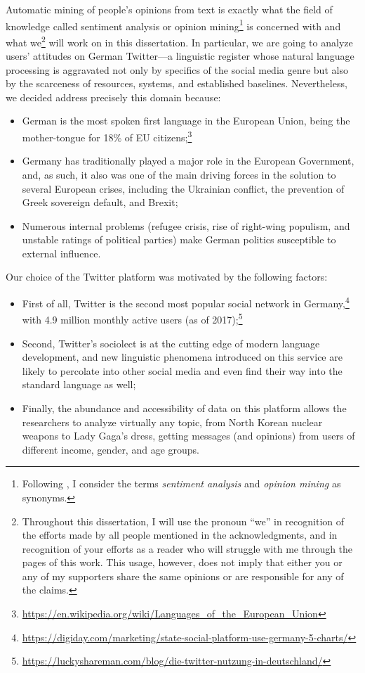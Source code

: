 Automatic mining of people's opinions from text is exactly what the
field of knowledge called sentiment analysis or opinion
mining\footnote{Following \citet{Liu:12}, I consider the terms
  \emph{sentiment analysis} and \emph{opinion mining} as synonyms.} is
concerned with and what we\footnote{Throughout this dissertation, I
  will use the pronoun ``we'' in recognition of the efforts made by
  all people mentioned in the acknowledgments, and in recognition of
  your efforts as a reader who will struggle with me through the pages
  of this work.  This usage, however, does not imply that either you
  or any of my supporters share the same opinions or are responsible
  for any of the claims.} will work on in this dissertation.  In
particular, we are going to analyze users' attitudes on German
Twitter---a linguistic register whose natural language processing is
aggravated not only by specifics of the social media genre but also by
the scarceness of resources, systems, and established baselines.
Nevertheless, we decided address precisely this domain because:
\begin{itemize}
  \item German is the most spoken first language in the European
    Union, being the mother-tongue for 18\% of EU
    citizens;\footnote{\url{https://en.wikipedia.org/wiki/Languages_of_the_European_Union}}
  \item Germany has traditionally played a major role in the European
    Government, and, as such, it also was one of the main driving
    forces in the solution to several European crises, including the
    Ukrainian conflict, the prevention of Greek sovereign default, and
    Brexit;
  \item Numerous internal problems (refugee crisis, rise of right-wing
    populism, and unstable ratings of political parties) make German
    politics susceptible to external influence.
\end{itemize}

Our choice of the Twitter platform was motivated by the following
factors:
\begin{itemize}
  \item First of all, Twitter is the second most popular social
    network in
    Germany,\footnote{\url{https://digiday.com/marketing/state-social-platform-use-germany-5-charts/}}
    with 4.9 million monthly active users (as of
    2017);\footnote{\url{https://luckyshareman.com/blog/die-twitter-nutzung-in-deutschland/}}
  \item Second, Twitter's sociolect is at the cutting edge of modern
    language development, and new linguistic phenomena introduced on
    this service are likely to percolate into other social media and
    even find their way into the standard language as well;
  \item Finally, the abundance and accessibility of data on this
    platform allows the researchers to analyze virtually any topic,
    from North Korean nuclear weapons to Lady Gaga's dress, getting
    messages (and opinions) from users of different income, gender,
    and age groups.
\end{itemize}

